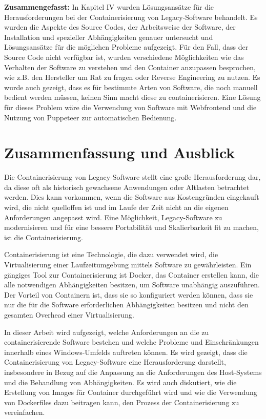\textbf{Zusammengefasst:}
In Kapitel IV wurden Lösungsansätze für die Herausforderungen bei der Containerisierung von Legacy-Software behandelt. Es wurden die Aspekte des Source Codes, der Arbeitsweise der Software, der Installation und spezieller Abhängigkeiten genauer untersucht und Lösungsansätze für die möglichen Probleme aufgezeigt. Für den Fall, dass der Source Code nicht verfügbar ist, wurden verschiedene Möglichkeiten wie das Verhalten der Software zu verstehen und den Container anzupassen besprochen, wie z.B. den Hersteller um Rat zu fragen oder Reverse Engineering zu nutzen. Es wurde auch gezeigt, dass es für bestimmte Arten von Software, die noch manuell bedient werden müssen, keinen Sinn macht diese zu containerisieren. Eine Lösung für dieses Problem wäre die Verwendung von Software mit Webfrontend und die Nutzung von Puppeteer zur automatischen Bedienung.

\section{Zusammenfassung und Ausblick}

Die Containerisierung von Legacy-Software stellt eine große Herausforderung dar, da diese oft als historisch gewachsene Anwendungen oder Altlasten betrachtet werden. Dies kann vorkommen, wenn die Software aus Kostengründen eingekauft wird, die nicht quelloffen ist und im Laufe der Zeit nicht an die eigenen Anforderungen angepasst wird. Eine Möglichkeit, Legacy-Software zu modernisieren und für eine bessere Portabilität und Skalierbarkeit fit zu machen, ist die Containerisierung.

Containerisierung ist eine Technologie, die dazu verwendet wird, die Virtualisierung einer Laufzeitumgebung mittels Software zu gewährleisten. Ein gängiges Tool zur Containerisierung ist Docker, das Container erstellen kann, die alle notwendigen Abhängigkeiten besitzen, um Software unabhängig auszuführen. Der Vorteil von Containern ist, dass sie so konfiguriert werden können, dass sie nur die für die Software erforderlichen Abhängigkeiten besitzen und nicht den gesamten Overhead einer Virtualisierung.

In dieser Arbeit wird aufgezeigt, welche Anforderungen an die zu containerisierende Software bestehen und welche Probleme und Einschränkungen innerhalb eines Windows-Umfelds auftreten können. Es wird gezeigt, dass die Containerisierung von Legacy-Software eine Herausforderung darstellt, insbesondere in Bezug auf die Anpassung an die Anforderungen des Host-Systems und die Behandlung von Abhängigkeiten. Es wird auch diskutiert, wie die Erstellung von Images für Container durchgeführt wird und wie die Verwendung von Dockerfiles dazu beitragen kann, den Prozess der Containerisierung zu vereinfachen.

